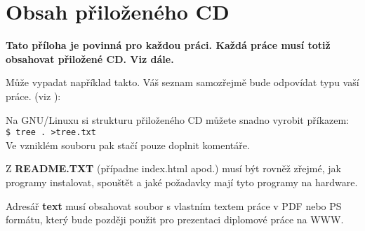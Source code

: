 \chapter{Obsah přiloženého CD}
\textbf{\large Tato příloha je povinná pro každou práci. Každá práce musí totiž obsahovat přiložené CD. Viz dále.}

Může vypadat například takto. Váš seznam samozřejmě bude odpovídat typu vaší práce. (viz \cite{infodp}):


Na GNU/Linuxu si strukturu přiloženého CD můžete snadno vyrobit příkazem:\\ 
\verb|$ tree . >tree.txt|\\
Ve vzniklém souboru pak stačí pouze doplnit komentáře.
	
Z \textbf{README.TXT} (případne index.html apod.)  musí být rovněž zřejmé, jak programy instalovat, spouštět a jaké požadavky mají tyto programy na hardware.

Adresář \textbf{text}  musí obsahovat soubor s vlastním textem práce v PDF nebo PS formátu, který bude později použit pro prezentaci diplomové práce na WWW.
